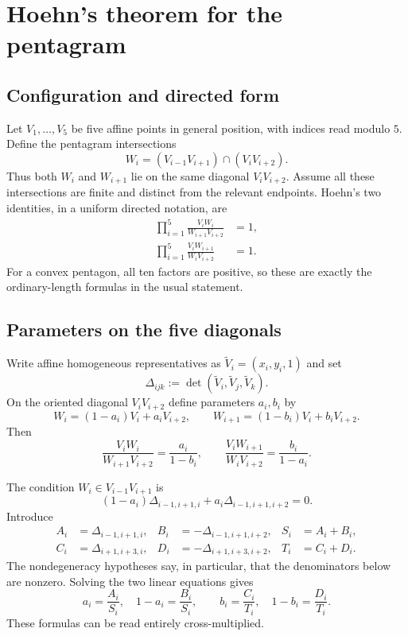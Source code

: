 \section{Hoehn's theorem for the pentagram}

\subsection{Configuration and directed form}

Let $V_1,\ldots,V_5$ be five affine points in general position, with indices
read modulo $5$.  Define the pentagram intersections
\begin{equation}\label{eq:hoehn-W}
 W_i=(V_{i-1}V_{i+1})\cap(V_iV_{i+2}).
\end{equation}
Thus both $W_i$ and $W_{i+1}$ lie on the same diagonal $V_iV_{i+2}$.  Assume
all these intersections are finite and distinct from the relevant endpoints.
Hoehn's two identities, in a uniform directed notation, are
\begin{align}
 \prod_{i=1}^{5}
 \frac{V_iW_i}{W_{i+1}V_{i+2}}&=1,
 \label{eq:hoehn-one}\\
 \prod_{i=1}^{5}
 \frac{V_iW_{i+1}}{W_iV_{i+2}}&=1.
 \label{eq:hoehn-two}
\end{align}
For a convex pentagon, all ten factors are positive, so these are exactly the
ordinary-length formulas in the usual statement.

\subsection{Parameters on the five diagonals}

Write affine homogeneous representatives as
$\widetilde V_i=(x_i,y_i,1)$ and set
\[
 \Delta_{ijk}:=\det(\widetilde V_i,\widetilde V_j,\widetilde V_k).
\]
On the oriented diagonal $V_iV_{i+2}$ define parameters $a_i,b_i$ by
\[
 W_i=(1-a_i)V_i+a_iV_{i+2},
 \qquad
 W_{i+1}=(1-b_i)V_i+b_iV_{i+2}.
\]
Then
\[
 \frac{V_iW_i}{W_{i+1}V_{i+2}}=\frac{a_i}{1-b_i},
 \qquad
 \frac{V_iW_{i+1}}{W_iV_{i+2}}=\frac{b_i}{1-a_i}.
\]

The condition $W_i\in V_{i-1}V_{i+1}$ is
\[
 (1-a_i)\Delta_{i-1,i+1,i}
 +a_i\Delta_{i-1,i+1,i+2}=0.
\]
Introduce
\begin{align*}
 A_i&=\Delta_{i-1,i+1,i},
 &B_i&=-\Delta_{i-1,i+1,i+2},
 &S_i&=A_i+B_i,\\
 C_i&=\Delta_{i+1,i+3,i},
 &D_i&=-\Delta_{i+1,i+3,i+2},
 &T_i&=C_i+D_i.
\end{align*}
The nondegeneracy hypotheses say, in particular, that the denominators below
are nonzero.  Solving the two linear equations gives
\begin{equation}\label{eq:hoehn-parameters}
 a_i=\frac{A_i}{S_i},
 \quad 1-a_i=\frac{B_i}{S_i},
 \qquad
 b_i=\frac{C_i}{T_i},
 \quad 1-b_i=\frac{D_i}{T_i}.
\end{equation}
These formulas can be read entirely cross-multiplied.

